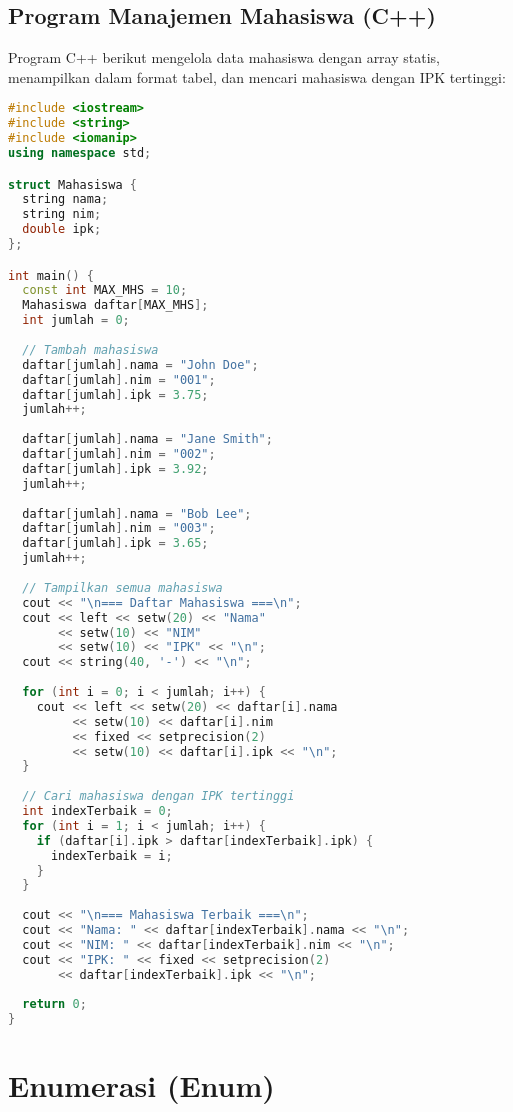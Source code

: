 \documentclass[../main.tex]{subfiles}
\begin{document}
\subsection{Program Manajemen Mahasiswa (C++)}

Program C++ berikut mengelola data mahasiswa dengan array statis, menampilkan dalam format tabel, dan mencari mahasiswa dengan IPK tertinggi:

\begin{lstlisting}[language=C++, caption={Program manajemen mahasiswa sederhana di C++}]
#include <iostream>
#include <string>
#include <iomanip>
using namespace std;

struct Mahasiswa {
  string nama;
  string nim;
  double ipk;
};

int main() {
  const int MAX_MHS = 10;
  Mahasiswa daftar[MAX_MHS];
  int jumlah = 0;
  
  // Tambah mahasiswa
  daftar[jumlah].nama = "John Doe";
  daftar[jumlah].nim = "001";
  daftar[jumlah].ipk = 3.75;
  jumlah++;
  
  daftar[jumlah].nama = "Jane Smith";
  daftar[jumlah].nim = "002";
  daftar[jumlah].ipk = 3.92;
  jumlah++;
  
  daftar[jumlah].nama = "Bob Lee";
  daftar[jumlah].nim = "003";
  daftar[jumlah].ipk = 3.65;
  jumlah++;
  
  // Tampilkan semua mahasiswa
  cout << "\n=== Daftar Mahasiswa ===\n";
  cout << left << setw(20) << "Nama" 
       << setw(10) << "NIM" 
       << setw(10) << "IPK" << "\n";
  cout << string(40, '-') << "\n";
  
  for (int i = 0; i < jumlah; i++) {
    cout << left << setw(20) << daftar[i].nama
         << setw(10) << daftar[i].nim
         << fixed << setprecision(2)
         << setw(10) << daftar[i].ipk << "\n";
  }
  
  // Cari mahasiswa dengan IPK tertinggi
  int indexTerbaik = 0;
  for (int i = 1; i < jumlah; i++) {
    if (daftar[i].ipk > daftar[indexTerbaik].ipk) {
      indexTerbaik = i;
    }
  }
  
  cout << "\n=== Mahasiswa Terbaik ===\n";
  cout << "Nama: " << daftar[indexTerbaik].nama << "\n";
  cout << "NIM: " << daftar[indexTerbaik].nim << "\n";
  cout << "IPK: " << fixed << setprecision(2) 
       << daftar[indexTerbaik].ipk << "\n";
  
  return 0;
}
\end{lstlisting}

\section{Enumerasi (Enum)}
\end{document}
